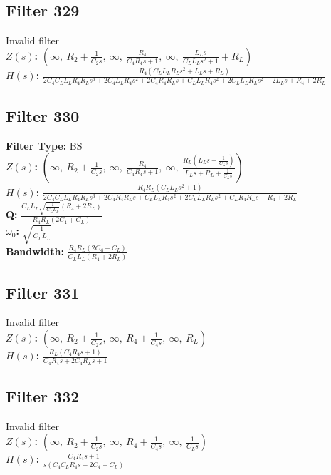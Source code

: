 \documentclass{article}
\begin{document}
\subsection*{Filter 329}
Invalid filter \\ 
\textbf{$Z(s)$:} $\left( \infty, \  R_{2} + \frac{1}{C_{2} s}, \  \infty, \  \frac{R_{4}}{C_{4} R_{4} s + 1}, \  \infty, \  \frac{L_{L} s}{C_{L} L_{L} s^{2} + 1} + R_{L}\right)$ \\ 
\textbf{$H(s)$:} $\frac{R_{4} \left(C_{L} L_{L} R_{L} s^{2} + L_{L} s + R_{L}\right)}{2 C_{4} C_{L} L_{L} R_{4} R_{L} s^{3} + 2 C_{4} L_{L} R_{4} s^{2} + 2 C_{4} R_{4} R_{L} s + C_{L} L_{L} R_{4} s^{2} + 2 C_{L} L_{L} R_{L} s^{2} + 2 L_{L} s + R_{4} + 2 R_{L}}$ \\ 
\subsection*{Filter 330}
\textbf{Filter Type:} BS \\ 
\textbf{$Z(s)$:} $\left( \infty, \  R_{2} + \frac{1}{C_{2} s}, \  \infty, \  \frac{R_{4}}{C_{4} R_{4} s + 1}, \  \infty, \  \frac{R_{L} \left(L_{L} s + \frac{1}{C_{L} s}\right)}{L_{L} s + R_{L} + \frac{1}{C_{L} s}}\right)$ \\ 
\textbf{$H(s)$:} $\frac{R_{4} R_{L} \left(C_{L} L_{L} s^{2} + 1\right)}{2 C_{4} C_{L} L_{L} R_{4} R_{L} s^{3} + 2 C_{4} R_{4} R_{L} s + C_{L} L_{L} R_{4} s^{2} + 2 C_{L} L_{L} R_{L} s^{2} + C_{L} R_{4} R_{L} s + R_{4} + 2 R_{L}}$ \\ 
\textbf{Q:} $\frac{C_{L} L_{L} \sqrt{\frac{1}{C_{L} L_{L}}} \left(R_{4} + 2 R_{L}\right)}{R_{4} R_{L} \left(2 C_{4} + C_{L}\right)}$ \\ 
\textbf{$\omega_0$:} $\sqrt{\frac{1}{C_{L} L_{L}}}$ \\ 
\textbf{Bandwidth:} $\frac{R_{4} R_{L} \left(2 C_{4} + C_{L}\right)}{C_{L} L_{L} \left(R_{4} + 2 R_{L}\right)}$ \\ 
\subsection*{Filter 331}
Invalid filter \\ 
\textbf{$Z(s)$:} $\left( \infty, \  R_{2} + \frac{1}{C_{2} s}, \  \infty, \  R_{4} + \frac{1}{C_{4} s}, \  \infty, \  R_{L}\right)$ \\ 
\textbf{$H(s)$:} $\frac{R_{L} \left(C_{4} R_{4} s + 1\right)}{C_{4} R_{4} s + 2 C_{4} R_{L} s + 1}$ \\ 
\subsection*{Filter 332}
Invalid filter \\ 
\textbf{$Z(s)$:} $\left( \infty, \  R_{2} + \frac{1}{C_{2} s}, \  \infty, \  R_{4} + \frac{1}{C_{4} s}, \  \infty, \  \frac{1}{C_{L} s}\right)$ \\ 
\textbf{$H(s)$:} $\frac{C_{4} R_{4} s + 1}{s \left(C_{4} C_{L} R_{4} s + 2 C_{4} + C_{L}\right)}$ \\ 
\end{document}
